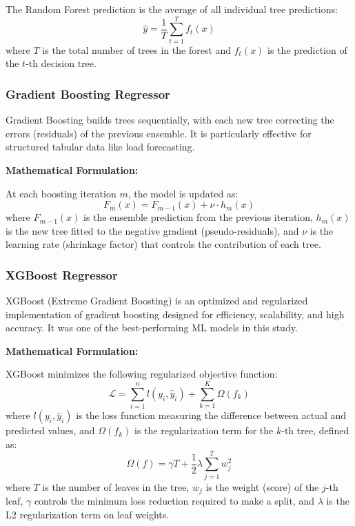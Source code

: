 \documentclass[oneside, 12pt]{book}
\numberwithin{equation}{chapter}
\begin{document}
The Random Forest prediction is the average of all individual tree predictions:
\begin{equation}
\hat{y} = \frac{1}{T} \sum_{t=1}^{T} f_t(x)
\end{equation}
where $T$ is the total number of trees in the forest and $f_t(x)$ is the prediction of the $t$-th decision tree.

\subsubsection{Gradient Boosting Regressor}

Gradient Boosting \parencite{friedman2001gradient} builds trees sequentially, with each new tree correcting the errors (residuals) of the previous ensemble. It is particularly effective for structured tabular data like load forecasting.

\textbf{Mathematical Formulation:}

At each boosting iteration $m$, the model is updated as:
\begin{equation}
F_m(x) = F_{m-1}(x) + \nu \cdot h_m(x)
\end{equation}
where $F_{m-1}(x)$ is the ensemble prediction from the previous iteration, $h_m(x)$ is the new tree fitted to the negative gradient (pseudo-residuals), and $\nu$ is the learning rate (shrinkage factor) that controls the contribution of each tree.

\subsubsection{XGBoost Regressor}

XGBoost (Extreme Gradient Boosting) \parencite{chen2016xgboost} is an optimized and regularized implementation of gradient boosting designed for efficiency, scalability, and high accuracy. It was one of the best-performing ML models in this study.

\textbf{Mathematical Formulation:}

XGBoost minimizes the following regularized objective function:
\begin{equation}
\mathcal{L} = \sum_{i=1}^{n} l(y_i, \hat{y}_i) + \sum_{k=1}^{K} \Omega(f_k)
\end{equation}
where $l(y_i, \hat{y}_i)$ is the loss function measuring the difference between actual and predicted values, and $\Omega(f_k)$ is the regularization term for the $k$-th tree, defined as:
\begin{equation}
\Omega(f) = \gamma T + \frac{1}{2} \lambda \sum_{j=1}^{T} w_j^2
\end{equation}
where $T$ is the number of leaves in the tree, $w_j$ is the weight (score) of the $j$-th leaf, $\gamma$ controls the minimum loss reduction required to make a split, and $\lambda$ is the L2 regularization term on leaf weights.
\end{document}
